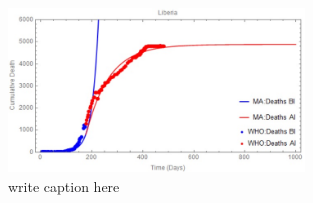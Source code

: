 \begin{figure}
  \centering
  \includegraphics[width=0.7\textwidth]{CumulativeDeathMathematica}
  \caption{write caption here}
\label{fig:Validation of calibration. Dots represent cumulative death data and the lines represent simulation based on mean posterior parameters. (Blue) - pre intervention and (red) - post treatment.}
\end{figure}
